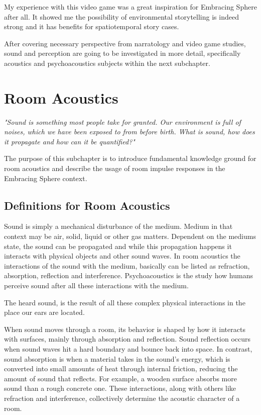             My experience with this video game was a great inspiration for Embracing Sphere after all. It showed me the possibility of environmental storytelling is indeed strong and it has benefits for spatiotemporal story cases.\par

            After covering necessary perspective from narratology and video game studies, sound and perception are going to be investigated in more detail, specifically acoustics and psychoacoustics subjects within the next subchapter.
            \section{Room Acoustics}
        \emph{"Sound is something most people take for granted. Our environment is full of noises, which we have been exposed to from before birth. What is sound, how does it propagate and how can it be quantified\cite{Acoustics_and_Psychophysics}?"}\par 

        The purpose of this subchapter is to introduce fundamental knowledge ground for room acoustics and describe the usage of room impulse responses in the Embracing Sphere context.\par
        \subsection{Definitions for Room Acoustics}
            Sound is simply a mechanical disturbance of the medium. Medium in that context may be air, solid, liquid or other gas matters. Dependent on the mediums state, the sound can be propagated and while this propagation happens it interacts with physical objects and other sound waves. In room acoustics the interactions of the sound with the medium, basically can be listed as refraction, absorption, reflection and interference. Psychoacoustics is the study how humans perceive sound after all these interactions with the medium\cite{Acoustics_and_Psychophysics}.\par

            The heard sound, is the result of all these complex physical interactions in the place our ears are located.\par

            When sound moves through a room, its behavior is shaped by how it interacts with surfaces, mainly through absorption and reflection. Sound reflection occurs when sound waves hit a hard boundary and bounce back into space. In contrast, sound absorption is when a material takes in the sound's energy, which is converted into small amounts of heat through internal friction, reducing the amount of sound that reflects\cite{Acoustics_and_Psychophysics}. For example, a wooden surface absorbs more sound than a rough concrete one. These interactions, along with others like refraction and interference, collectively determine the acoustic character of a room.\par

